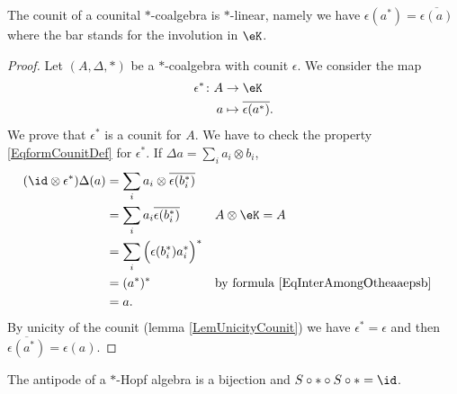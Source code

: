 \begin{lemma}       \label{LemcounitstarHopfalg}
    The counit of a counital \( *\)-coalgebra is \( *\)-linear, namely we have \( \epsilon(a^*)=\overline{ \epsilon(a) }\) where the bar stands for the involution in \( \eK\).
\end{lemma}

\begin{proof}
    Let \( (A,\Delta,*)\) be a \( *\)-coalgebra with counit \( \epsilon\). We consider the map
    \begin{equation}
        \begin{aligned}
            \epsilon^*\colon A&\to \eK \\
            a&\mapsto \overline{ \epsilon(a^*) }. 
        \end{aligned}
    \end{equation}
    We prove that $\epsilon^*$ is a counit for \( A\). We have to check the property \eqref{EqformCounitDef} for \( \epsilon^*\). If \( \Delta a=\sum_ia_i\otimes b_i\),
    \begin{equation}
        \begin{aligned}[]
            (\id\otimes\epsilon^*)\Delta(a)&=\sum_ia_i\otimes\overline{ \epsilon(b_i^*) }\\
            &=\sum_ia_i\overline{ \epsilon(b_i^*) }     &&A\otimes\eK=A\\
            &=\sum_i\Big( \epsilon(b_i^*)a_i^* \Big)^*\\
            &=(a^*)^*       &&\text{by formula \eqref{EqInterAmongOtheaaepsb}}\\
            &=a.
        \end{aligned}
    \end{equation}
    By unicity of the counit (lemma \ref{LemUnicityCounit}) we have \( \epsilon^*=\epsilon\) and then \( \overline{ \epsilon(a^*) }=\epsilon(a)\).
\end{proof}

\begin{theorem}
    The antipode of a $*$-Hopf algebra is a bijection and \( S\circ *\circ S\circ *=\id\).
\end{theorem}

